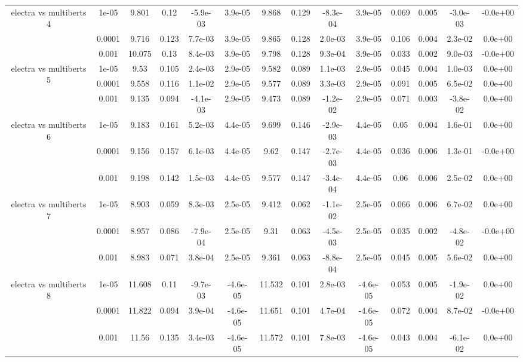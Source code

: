 \begin{tabular}{|c|c|c|c|c|c|c|c|c|c|c|c|c|c|}
\hline
\multirow{3}{*}{electra  vs multiberts 4} & 1e-05 & 9.801 & 0.12 & -5.9e-03 & 3.9e-05 & 9.868 & 0.129 & -8.3e-04 & 3.9e-05 & 0.069 & 0.005 & -3.0e-03 & -0.0e+00 \\
 & 0.0001 & 9.716 & 0.123 & 7.7e-03 & 3.9e-05 & 9.865 & 0.128 & 2.0e-03 & 3.9e-05 & 0.106 & 0.004 & 2.3e-02 & 0.0e+00 \\
 & 0.001 & 10.075 & 0.13 & 8.4e-03 & 3.9e-05 & 9.798 & 0.128 & 9.3e-04 & 3.9e-05 & 0.033 & 0.002 & 9.0e-03 & -0.0e+00 \\
\hline
\multirow{3}{*}{electra  vs multiberts 5} & 1e-05 & 9.53 & 0.105 & 2.4e-03 & 2.9e-05 & 9.582 & 0.089 & 1.1e-03 & 2.9e-05 & 0.045 & 0.004 & 1.0e-03 & 0.0e+00 \\
 & 0.0001 & 9.558 & 0.116 & 1.1e-02 & 2.9e-05 & 9.577 & 0.089 & 3.3e-03 & 2.9e-05 & 0.091 & 0.005 & 6.5e-02 & 0.0e+00 \\
 & 0.001 & 9.135 & 0.094 & -4.1e-03 & 2.9e-05 & 9.473 & 0.089 & -1.2e-02 & 2.9e-05 & 0.071 & 0.003 & -3.8e-02 & 0.0e+00 \\
\hline
\multirow{3}{*}{electra  vs multiberts 6} & 1e-05 & 9.183 & 0.161 & 5.2e-03 & 4.4e-05 & 9.699 & 0.146 & -2.9e-03 & 4.4e-05 & 0.05 & 0.004 & 1.6e-01 & 0.0e+00 \\
 & 0.0001 & 9.156 & 0.157 & 6.1e-03 & 4.4e-05 & 9.62 & 0.147 & -2.7e-03 & 4.4e-05 & 0.036 & 0.006 & 1.3e-01 & -0.0e+00 \\
 & 0.001 & 9.198 & 0.142 & 1.5e-03 & 4.4e-05 & 9.577 & 0.147 & -3.4e-04 & 4.4e-05 & 0.06 & 0.006 & 2.5e-02 & 0.0e+00 \\
\hline
\multirow{3}{*}{electra  vs multiberts 7} & 1e-05 & 8.903 & 0.059 & 8.3e-03 & 2.5e-05 & 9.412 & 0.062 & -1.1e-02 & 2.5e-05 & 0.066 & 0.006 & 6.7e-02 & 0.0e+00 \\
 & 0.0001 & 8.957 & 0.086 & -7.9e-04 & 2.5e-05 & 9.31 & 0.063 & -4.5e-03 & 2.5e-05 & 0.035 & 0.002 & -4.8e-02 & -0.0e+00 \\
 & 0.001 & 8.983 & 0.071 & 3.8e-04 & 2.5e-05 & 9.361 & 0.063 & -8.8e-04 & 2.5e-05 & 0.045 & 0.005 & 5.6e-02 & 0.0e+00 \\
\hline
\multirow{3}{*}{electra  vs multiberts 8} & 1e-05 & 11.608 & 0.11 & -9.7e-03 & -4.6e-05 & 11.532 & 0.101 & 2.8e-03 & -4.6e-05 & 0.053 & 0.005 & -1.9e-02 & 0.0e+00 \\
 & 0.0001 & 11.822 & 0.094 & 3.9e-04 & -4.6e-05 & 11.651 & 0.101 & 4.7e-04 & -4.6e-05 & 0.072 & 0.004 & 8.7e-02 & -0.0e+00 \\
 & 0.001 & 11.56 & 0.135 & 3.4e-03 & -4.6e-05 & 11.572 & 0.101 & 7.8e-03 & -4.6e-05 & 0.043 & 0.004 & -6.1e-02 & 0.0e+00 \\

\end{tabular}
